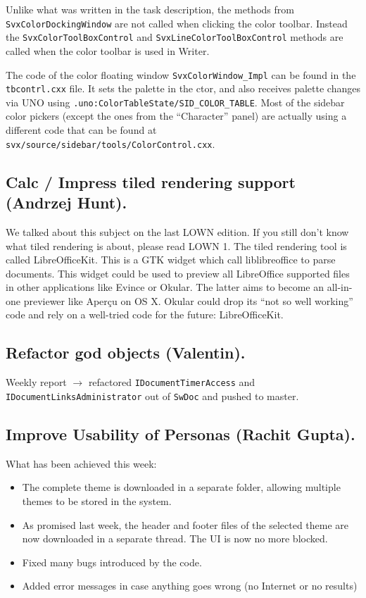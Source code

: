 \documentclass{article}
\begin{document}
Unlike what was written in the task description, the methods from \lstinline|SvxColorDockingWindow|\cite{gsocColorSelectionMethod1} are not called when clicking the color toolbar. Instead the \lstinline|SvxColorToolBoxControl|\cite{gsocColorSelectionMethod2} and \lstinline|SvxLineColorToolBoxControl| methods are called when the color toolbar is used in Writer\cite{gsocColorSelection1}.

The code of the color floating window \lstinline|SvxColorWindow_Impl| can be found in the \lstinline|tbcontrl.cxx| file. It sets the palette in the ctor, and also receives palette changes via UNO using 
\lstinline|.uno:ColorTableState/SID_COLOR_TABLE|.
Most of the sidebar color pickers (except the ones from 
the ``Character'' panel) are actually using a different code that can be found 
at \lstinline|svx/source/sidebar/tools/ColorControl.cxx|.

\subsection{Calc / Impress tiled rendering support (Andrzej Hunt).}

We talked about this subject on the last LOWN edition. If you still don't know what tiled rendering is about, please read LOWN 1. The tiled rendering tool is called LibreOfficeKit. This is a GTK widget which call liblibreoffice to parse documents. This widget could be used to preview all LibreOffice supported files in other applications like Evince or Okular. The latter aims to become an all-in-one previewer like Aperçu on OS X. Okular could drop its ``not so well working'' code and rely on a well-tried code for the future: LibreOfficeKit\cite{libreofficeKit}\cite{gsocLibreOfficeKit}.

\subsection{Refactor god objects (Valentin).}

Weekly report $\rightarrow$ refactored \lstinline|IDocumentTimerAccess| and \lstinline|IDocumentLinksAdministrator| out of \lstinline|SwDoc| and pushed to master.

\subsection{Improve Usability of Personas (Rachit Gupta).}

What has been achieved this week\cite{gsocPersona}:
\begin{itemize}
    \item The complete theme is downloaded in a separate folder, allowing multiple themes to be stored in the system.
    \item As promised last week, the header and footer files of the selected theme are now downloaded in a separate thread. The UI is now no more blocked.
    \item Fixed many bugs introduced by the code.
    \item Added error messages in case anything goes wrong (no Internet or no results)

\end{itemize}
\end{document}
